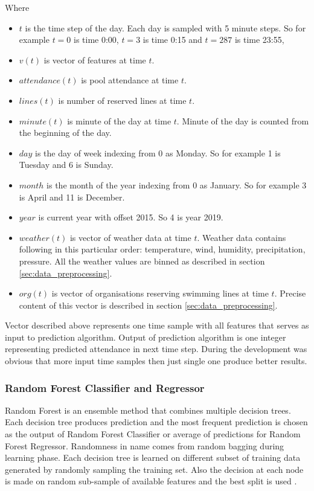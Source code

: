 \documentclass{article}
\begin{document}
Where 
\begin{itemize}
    \item $t$ is the time step of the day. Each day is sampled with 5 minute steps. So for example $t = 0$ is time 0:00, $t = 3$ is time 0:15 and $t = 287$ is time 23:55, 
    \item $v(t)$ is vector of features at time $t$.
    \item $attendance(t)$ is pool attendance at time $t$.
    \item $lines(t)$ is number of reserved lines at time $t$.
    \item $minute(t)$ is minute of the day at time $t$. Minute of the day is counted from the beginning of the day.
    \item $day$ is the day of week indexing from 0 as Monday. So for example 1 is Tuesday and 6 is Sunday.
    \item $month$ is the month of the year indexing from 0 as January. So for example 3 is April and 11 is December.
    \item $year$ is current year with offset 2015. So 4 is year 2019.
    \item $weather(t)$ is vector of weather data at time $t$. Weather data contains following in this particular order: temperature, wind, humidity, precipitation, pressure. All the weather values are binned as described in section \ref{sec:data_preprocessing}.
    \item $org(t)$ is  vector of organisations reserving swimming lines at time $t$. Precise content of this vector is described in section \ref{sec:data_preprocessing}.
\end{itemize}

Vector described above represents one time sample with all features that serves as input to prediction algorithm. Output of prediction algorithm is one integer representing predicted attendance in next time step. During the development was obvious that more input time samples then just single one produce better results. 

\subsubsection{Random Forest Classifier and Regressor}
Random Forest is an ensemble method that combines multiple decision trees. Each decision tree produces prediction and the most frequent prediction is chosen as the output of Random Forest Classifier or average of predictions for Random Forest Regressor. Randomness in name comes from random bagging during learning phase. Each decision tree is learned on different subset of training data generated by randomly sampling the training set. Also the decision at each node is made on random sub-sample of available features and the best split is used \citep{yiu2019randomforest} \citep{wiki2019randomforest}.
\end{document}
